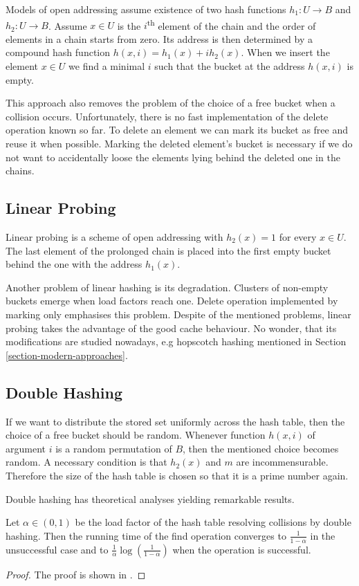 Models of open addressing assume existence of two hash functions $h_1: U \rightarrow B$ and $h_2: U \rightarrow B$. Assume $x \in U$ is the $i$\textsuperscript{th} element of the chain and the order of elements in a chain starts from zero. Its address is then determined by a compound hash function $h(x, i) = h_1(x) + i h_2(x)$. When we insert the element $x \in U$ we find a minimal $i$ such that the bucket at the address $h(x, i)$ is empty.

This approach also removes the problem of the choice of a free bucket when a collision occurs. Unfortunately, there is no fast implementation of the delete operation known so far. To delete an element we can mark its bucket as free and reuse it when possible. Marking the deleted element's bucket is necessary if we do not want to accidentally loose the elements lying behind the deleted one in the chains.

\subsection{Linear Probing}
Linear probing is a scheme of open addressing with $h_2(x) = 1$ for every $x \in U$. The last element of the prolonged chain is placed into the first empty bucket behind the one with the address $h_1(x)$.

Another problem of linear hashing is its degradation. Clusters of non-empty buckets emerge when load factors reach one. Delete operation implemented by marking only emphasises this problem. Despite of the mentioned problems, linear probing takes the advantage of the good cache behaviour. No wonder, that its modifications are studied nowadays, e.g hopscotch hashing mentioned in Section \ref{section-modern-approaches}.

\subsection{Double Hashing}
If we want to distribute the stored set uniformly across the hash table, then the choice of a free bucket should be random. Whenever function $h(x, i)$ of argument $i$ is a random permutation of $B$, then the mentioned choice becomes random. A necessary condition is that $h_2(x)$ and $m$ are incommensurable. Therefore the size of the hash table is chosen so that it is a prime number again. 

Double hashing has theoretical analyses yielding remarkable results.
\begin{theorem}
Let $\alpha \in (0, 1)$ be the load factor of the hash table resolving collisions by double hashing. Then the running time of the find operation  converges to $\frac{1}{1 - \alpha}$ in the unsuccessful case and to $\frac{1}{\alpha}\log\left(\frac{1}{1 - \alpha}\right)$ when the operation is successful.
\end{theorem}
\begin{proof}
The proof is shown in \cite{DBLP:books/sp/Mehlhorn84}.
\end{proof}

